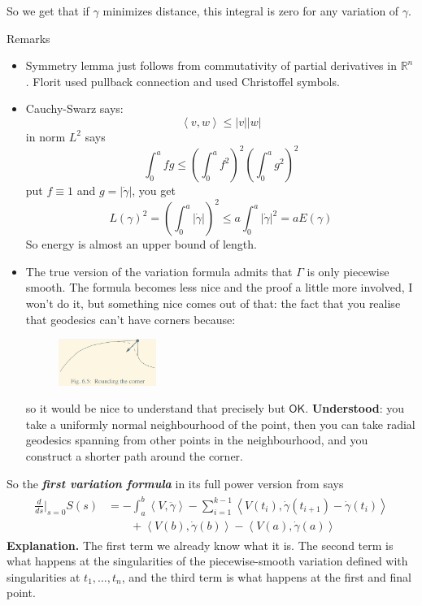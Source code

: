 So we get that if \(\gamma\) minimizes distance, this integral is zero for any variation of \(\gamma\).

\begin{thing8}{Remarks}\leavevmode
\begin{itemize}
\item Symmetry lemma just follows from commutativity of partial derivatives in \(\mathbb{R}^{n}\). Florit used pullback connection and \cite{ler} used Christoffel symbols.
\item Cauchy-Swarz says:
	\[\boxed{\left<v,w\right>\leq |v||w|}\]
	in norm \(L^2\) says
	\[\int_0^a fg\leq \left(\int_0^a f^2\right)^2 \left(\int_0^a g^2\right)^2\]
put \(f\equiv1\) and \(g=|\dot\gamma|\), you get
\[L(\gamma)^2=\left(\int_0^a |\dot\gamma|\right)^2 \leq a \int_0^a |\dot\gamma|^2=aE(\gamma)\]
So energy is almost an upper bound of length.
\item The true version of the variation formula admits that \(\Gamma\) is only piecewise smooth. The formula becomes less nice and the proof a little more involved, I won't do it, but something nice comes out of that: the fact that you realise that geodesics can't have corners because:
	\begin{figure}[H]
		\centering
		\includegraphics[width=0.3\textwidth]{fig3}
	\end{figure}
	so it would be nice to understand that precisely but \(\mathsf{OK}\). \textbf{Understood}: you take a uniformly normal neighbourhood of the point, then you can take radial geodesics spanning from other points in the neighbourhood, and you construct a shorter path around the corner.
\end{itemize}
\end{thing8}

So the \textit{\textbf{first variation formula}} in its full power version from \cite{ler} says
\begin{align*}
	\boxed{\begin{array}{rl}\frac{d}{ds}\Big|_{s=0}S(s)&=-\int_a^b\left<V,\ddot \gamma\right>-\sum_{i=1}^{k-1}\left<V(t_i),\dot\gamma(t_{i+1})-\dot\gamma(t_{i})\right>\\
				   & \qquad +\left<V(b),\dot\gamma(b)\right>-\left<V(a),\dot\gamma(a)\right>\end{array}}
	\end{align*}
\textbf{Explanation.} The first term we already know what it is. The second term is what happens at the singularities of the piecewise-smooth variation defined with singularities at \(t_1,\ldots,t_n\), and the third term is what happens at the first and final point.

